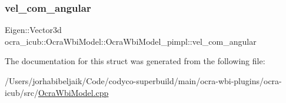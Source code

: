 \hypertarget{structOcraWbiModel_1_1OcraWbiModel__pimpl_a696d73e62837978589a2730c8feb325c}{}\label{structOcraWbiModel_1_1OcraWbiModel__pimpl_a696d73e62837978589a2730c8feb325c} 
\subsubsection{\texorpdfstring{vel\+\_\+com\+\_\+angular}{vel\_com\_angular}}
{\footnotesize\ttfamily Eigen\+::\+Vector3d ocra\+\_\+icub\+::\+Ocra\+Wbi\+Model\+::\+Ocra\+Wbi\+Model\+\_\+pimpl\+::vel\+\_\+com\+\_\+angular}



The documentation for this struct was generated from the following file\+:\begin{DoxyCompactItemize}
\item 
/\+Users/jorhabibeljaik/\+Code/codyco-\/superbuild/main/ocra-\/wbi-\/plugins/ocra-\/icub/src/\hyperlink{OcraWbiModel_8cpp}{Ocra\+Wbi\+Model.\+cpp}\end{DoxyCompactItemize}
